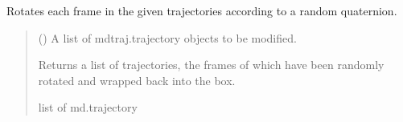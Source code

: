 \documentclass[a4paper,10pt,english]{report}
\begin{document}
\begin{fulllineitems}
\label{\detokenize{NNucleate:NNucleate.utils.rotate_trajs}}
\pysigstartsignatures
{}
\pysigstopsignatures
\sphinxAtStartPar
Rotates each frame in the given trajectories according to a random quaternion.
\begin{quote}\begin{description}
\sphinxAtStartPar
{} () \textendash{} A list of mdtraj.trajectory objects to be modified.

\sphinxAtStartPar
Returns a list of trajectories, the frames of which have been randomly rotated and wrapped back into the box.

\sphinxAtStartPar
list of md.trajectory

\end{description}\end{quote}

\end{fulllineitems}

\end{document}
